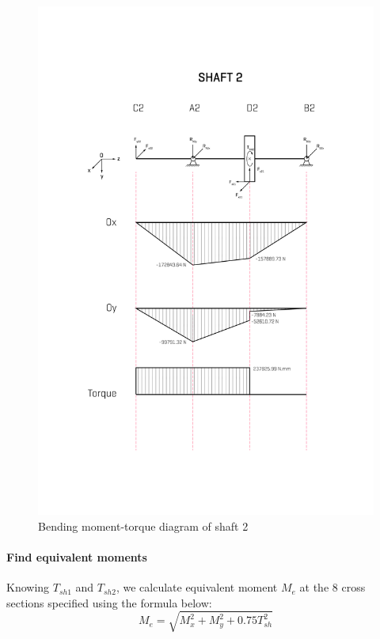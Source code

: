\begin{figure}[ht]
	\centering
	\includegraphics[width=150mm]{mshaft2.png}
	\caption{Bending moment-torque diagram of shaft 2}
	\label{mshaft2}
\end{figure}

\paragraph{Find equivalent moments} Knowing $ T_{sh1} $ and $ T_{sh2} $, we calculate equivalent moment $ M_e $ at the 8 cross sections specified using the formula below:
\[M_e = \sqrt{M_x^2 + M_y^2 + 0.75T_{sh}^2}\]


